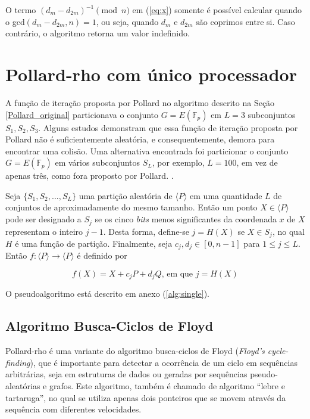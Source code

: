 O termo $(d_m - d_{2m})^{-1} \pmod n$ em (\ref{eq:x}) somente é possível calcular quando o gcd$(d_m - d_{2m}, n) = 1$, ou seja, quando \(d_m\) e \(d_{2m}\) são coprimos entre si. Caso contrário, o algoritmo retorna um valor indefinido.

%
%
\section{Pollard-rho com único processador} \label{sec:single}

A função de iteração proposta por Pollard no algoritmo descrito na Seção \ref{Pollard_original} particionava o conjunto $G = E(\mathbb{F}_p)$ em \(L = 3\) subconjuntos \(S_1, S_2, S_3\). Alguns estudos demonstram que essa função de iteração proposta por Pollard não é suficientemente aleatória, e consequentemente, demora para encontrar uma colisão. Uma alternativa encontrada foi particionar o conjunto $G = E(\mathbb{F}_p)$ em vários subconjuntos $S_L$, por exemplo, \(L = 100\), em vez de apenas três, como fora proposto por Pollard. \cite{Laporta:2014}.

Seja $\{S_1, S_2, ..., S_L\}$ uma partição aleatória de $\langle P \rangle$ em uma quantidade \(L\) de conjuntos de aproximadamente do mesmo tamanho. Então um ponto $X \in \langle P \rangle$ pode ser designado a \(S_j\) se os cinco \textit{bits} menos significantes da coordenada \(x\) de \(X\) representam o inteiro \(j-1\). Desta forma, define-se $j = H(X)$ se $X \in S_j$, no qual \(H\) é uma função de partição. Finalmente, seja $c_j, d_j \in [0, n-1]$ para $1 \leq j \leq L$. Então $f : \langle P \rangle \to  \langle P \rangle$ é definido por

\begin{equation*}
f(X) = X + c_jP + d_jQ \textrm{, em que } j = H(X)
\end{equation*}

O pseudoalgoritmo está descrito em anexo (\ref{alg:single}).

%
%
\subsection{Algoritmo Busca-Ciclos de Floyd} \label{floyd}
Pollard-rho é uma variante do algoritmo busca-ciclos de Floyd (\textit{Floyd's cycle-finding}), que é importante para detectar a ocorrência de um ciclo em sequências arbitrárias, seja em estruturas de dados ou geradas por sequências pseudo-aleatórias e grafos. Este algoritmo, também é chamado de algoritmo ``lebre e tartaruga'', no qual se utiliza apenas dois ponteiros que se movem através da sequência com diferentes velocidades.

